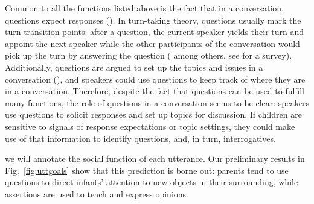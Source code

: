 Common to all the functions listed above is the fact that in a conversation, questions expect responses (\citealt{duncan1972turn}). In turn-taking theory, questions usually mark the turn-transition points: after a question, the current speaker yields their turn and appoint the next speaker while the other participants of the conversation would pick up the turn by answering the question (\citealt{kendon1967gaze, argyle1972gaze, levinson1983, tice2011turn} among others, see \citealt{enfield2010} for a survey).  Additionally, questions are argued to set up the topics and issues in a conversation (\citealt{roberts2012,farkasbruce2010}), and speakers could use questions to keep track of where they are in a conversation. Therefore, despite the fact that questions can be used to fulfill many functions, the role of questions in a conversation seems to be clear: speakers use questions to solicit responses and set up topics for discussion. If children are sensitive to signals of response expectations or topic settings, they could make use of that information to identify questions, and, in turn, interrogatives. 


we will annotate the social function of each utterance. Our preliminary results in Fig.~\ref{fig:uttgoals} show that this prediction is borne out: parents tend to use questions to direct infants’ attention to new objects in their surrounding, while assertions are used to teach and express opinions.

